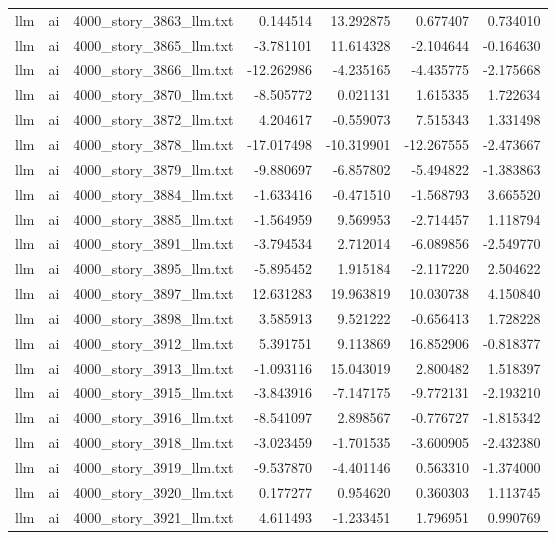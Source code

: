 \begin{longtable}{lllrrrr}
llm & ai & 4000\_story\_3863\_llm.txt & 0.144514 & 13.292875 & 0.677407 & 0.734010 \\
llm & ai & 4000\_story\_3865\_llm.txt & -3.781101 & 11.614328 & -2.104644 & -0.164630 \\
llm & ai & 4000\_story\_3866\_llm.txt & -12.262986 & -4.235165 & -4.435775 & -2.175668 \\
llm & ai & 4000\_story\_3870\_llm.txt & -8.505772 & 0.021131 & 1.615335 & 1.722634 \\
llm & ai & 4000\_story\_3872\_llm.txt & 4.204617 & -0.559073 & 7.515343 & 1.331498 \\
llm & ai & 4000\_story\_3878\_llm.txt & -17.017498 & -10.319901 & -12.267555 & -2.473667 \\
llm & ai & 4000\_story\_3879\_llm.txt & -9.880697 & -6.857802 & -5.494822 & -1.383863 \\
llm & ai & 4000\_story\_3884\_llm.txt & -1.633416 & -0.471510 & -1.568793 & 3.665520 \\
llm & ai & 4000\_story\_3885\_llm.txt & -1.564959 & 9.569953 & -2.714457 & 1.118794 \\
llm & ai & 4000\_story\_3891\_llm.txt & -3.794534 & 2.712014 & -6.089856 & -2.549770 \\
llm & ai & 4000\_story\_3895\_llm.txt & -5.895452 & 1.915184 & -2.117220 & 2.504622 \\
llm & ai & 4000\_story\_3897\_llm.txt & 12.631283 & 19.963819 & 10.030738 & 4.150840 \\
llm & ai & 4000\_story\_3898\_llm.txt & 3.585913 & 9.521222 & -0.656413 & 1.728228 \\
llm & ai & 4000\_story\_3912\_llm.txt & 5.391751 & 9.113869 & 16.852906 & -0.818377 \\
llm & ai & 4000\_story\_3913\_llm.txt & -1.093116 & 15.043019 & 2.800482 & 1.518397 \\
llm & ai & 4000\_story\_3915\_llm.txt & -3.843916 & -7.147175 & -9.772131 & -2.193210 \\
llm & ai & 4000\_story\_3916\_llm.txt & -8.541097 & 2.898567 & -0.776727 & -1.815342 \\
llm & ai & 4000\_story\_3918\_llm.txt & -3.023459 & -1.701535 & -3.600905 & -2.432380 \\
llm & ai & 4000\_story\_3919\_llm.txt & -9.537870 & -4.401146 & 0.563310 & -1.374000 \\
llm & ai & 4000\_story\_3920\_llm.txt & 0.177277 & 0.954620 & 0.360303 & 1.113745 \\
llm & ai & 4000\_story\_3921\_llm.txt & 4.611493 & -1.233451 & 1.796951 & 0.990769 \\

\end{longtable}
